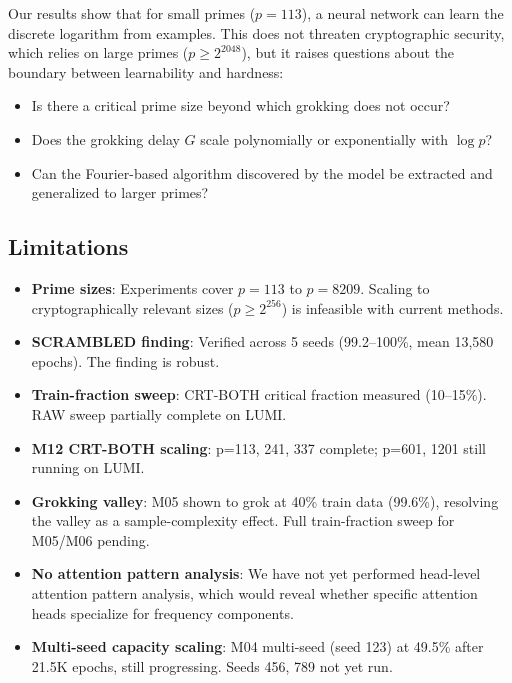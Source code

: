 \documentclass[11pt]{article}
\newcommand{\Gdelay}{G}
\begin{document}
Our results show that for small primes ($p = 113$), a neural network can learn the discrete logarithm from examples. This does not threaten cryptographic security, which relies on large primes ($p \geq 2^{2048}$), but it raises questions about the boundary between learnability and hardness:

\begin{itemize}[leftmargin=*]
    \item Is there a critical prime size beyond which grokking does not occur?
    \item Does the grokking delay $\Gdelay$ scale polynomially or exponentially with $\log p$?
    \item Can the Fourier-based algorithm discovered by the model be extracted and generalized to larger primes?
\end{itemize}

\subsection{Limitations}

\begin{itemize}[leftmargin=*]
    \item \textbf{Prime sizes}: Experiments cover $p = 113$ to $p = 8209$. Scaling to cryptographically relevant sizes ($p \geq 2^{256}$) is infeasible with current methods.
    \item \textbf{SCRAMBLED finding}: Verified across 5 seeds (99.2--100\%, mean 13,580 epochs). The finding is robust.
    \item \textbf{Train-fraction sweep}: CRT-BOTH critical fraction measured (10--15\%). RAW sweep partially complete on LUMI.
    \item \textbf{M12 CRT-BOTH scaling}: p=113, 241, 337 complete; p=601, 1201 still running on LUMI.
    \item \textbf{Grokking valley}: M05 shown to grok at 40\% train data (99.6\%), resolving the valley as a sample-complexity effect. Full train-fraction sweep for M05/M06 pending.
    \item \textbf{No attention pattern analysis}: We have not yet performed head-level attention pattern analysis, which would reveal whether specific attention heads specialize for frequency components.
    \item \textbf{Multi-seed capacity scaling}: M04 multi-seed (seed 123) at 49.5\% after 21.5K epochs, still progressing. Seeds 456, 789 not yet run.
\end{itemize}
\end{document}
